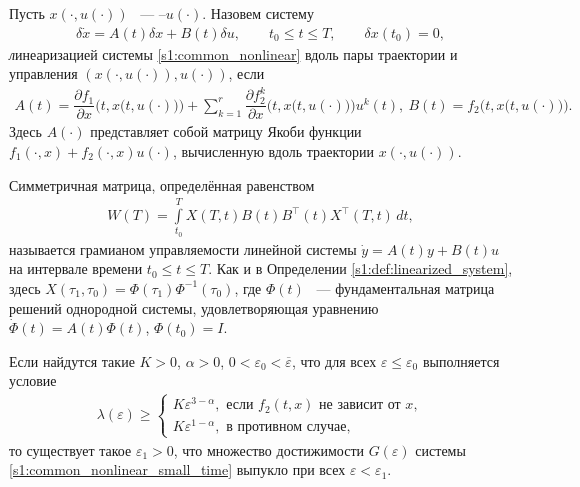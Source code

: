 \documentclass[../main.tex]{subfiles}
\begin{document}
\begin{definition}\label{s1:def:linearized_system}
	Пусть $ x(\cdot,u(\cdot)) $ ~--- --$ u(\cdot)$.
	Назовем систему
	\begin{gather}\label{s1:linearized_system}
		\delta \dot{x} = A(t) \delta x + B(t) \delta u, \qquad t_0 \leqslant t \leqslant T, \qquad \delta x(t_0) = 0,
	\end{gather}
	{\textit линеаризацией} системы \eqref{s1:common_nonlinear} вдоль пары траектории и управления $\left( x(\cdot,u(\cdot)),u(\cdot)\right) $, если 
	\begin{gather*}
		A(t) = \dfrac{\partial f_1}{\partial x} \Big(t,x\big(t,u(\cdot)\big)\Big) 
		+ 
		\sum\limits_{k = 1}^{r}
		\dfrac{\partial f_2^k}{\partial x}\Big(t,x\big(t,u(\cdot)\big)\Big) u^k(t), \ 
		B(t) = f_2 \Big(t,x\big(t,u(\cdot)\big)\Big).
	\end{gather*}
	Здесь $ A(\cdot) $ представляет собой матрицу Якоби функции $ f_1(\cdot, x) + f_2(\cdot, x) u(\cdot) $, вычисленную вдоль траектории $ x(\cdot,u(\cdot)) $.
\end{definition}

\begin{definition}\label{s1:def:grammian}
	Симметричная матрица, определённая равенством
	\begin{gather*}
		W(T) = \int\limits_{t_0}^{T}X(T,t)B(t)B^{\top}(t)X^{\top}(T,t) \, dt,
	\end{gather*}
	называется грамианом управляемости линейной системы $\dot{y} = A(t) y + B(t) u $ на интервале времени $ t_0 \leqslant t \leqslant T $.
	Как и в Определении \ref{s1:def:linearized_system}, здесь $ X(\tau_1,\tau_0)= \Phi(\tau_1) \Phi^{-1}(\tau_0) $, где $\Phi(t) $ ~--- фундаментальная матрица решений однородной системы, удовлетворяющая уравнению $ \dot{\Phi}(t) = A(t) \Phi(t)$, $ \Phi(t_0) = I $.
\end{definition}
\begin{theorem}\label{s1:th:small_time_convexity}
	Если найдутся такие $K > 0$, $ \alpha > 0$, $ 0 < \varepsilon_0 < \overline{\varepsilon}$, что для всех $\varepsilon \leqslant \varepsilon_0$ выполняется условие
	\begin{gather}\label{s1:small_time_convexity_condition}
		\lambda(\varepsilon) \geqslant \left\{ {\begin{array}{*{20}{l}}
				{K\varepsilon ^{3 - \alpha}, \mbox{\ если \ } f_2(t,x) \mbox{\ не зависит от \ } x}, \\
				{K\varepsilon ^{1 - \alpha}}, \mbox{\ в противном случае},
		\end{array}} \right.
	\end{gather}
	то существует такое $ \varepsilon_1 > 0 $, что множество достижимости $G(\varepsilon)$ системы \eqref{s1:common_nonlinear_small_time} выпукло при всех $\varepsilon < \varepsilon_1 $.
\end{theorem}
		
\end{document}
